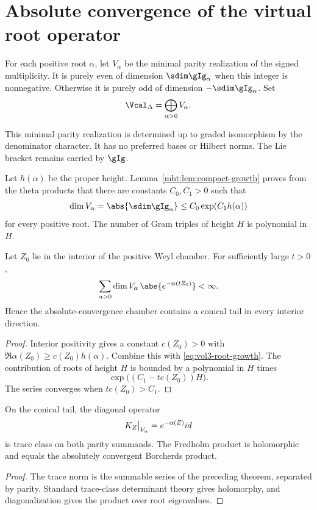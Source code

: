 \chapter{Absolute convergence of the virtual root operator}
For each positive root $\alpha$, let $V_\alpha$ be the minimal parity realization of the signed multiplicity. It is purely even of dimension $\sdim\gIg_\alpha$ when this integer is nonnegative. Otherwise it is purely odd of dimension $-\sdim\gIg_\alpha$. Set
\[
 \Vcal_\Delta=\widehat\bigoplus_{\alpha>0}V_\alpha.
\]

This minimal parity realization is determined up to graded isomorphism by the denominator character. It has no preferred bases or Hilbert norms. The Lie bracket remains carried by $\gIg$.

Let $h(\alpha)$ be the proper height.  Lemma~\ref{mht:lem:compact-growth} proves from the theta products that there are constants $C_0,C_1>0$ such that
\begin{equation}\label{eq:vol3-root-growth}
 \dim V_\alpha=\abs{\sdim\gIg_\alpha}\le C_0\exp(C_1h(\alpha))
\end{equation}
for every positive root.  The number of Gram triples of height $H$ is polynomial in $H$.

\begin{theorem}
Let $Z_0$ lie in the interior of the positive Weyl chamber.  For sufficiently large $t>0$,
\[
 \sum_{\alpha>0}\dim V_\alpha\,
 \abs{e^{-\alpha(tZ_0)}}<\infty.
\]
Hence the absolute-convergence chamber contains a conical tail in every interior direction.
\end{theorem}
\begin{proof}
Interior positivity gives a constant $c(Z_0)>0$ with
$\Re\alpha(Z_0)\ge c(Z_0)h(\alpha)$.
Combine this with \eqref{eq:vol3-root-growth}.  The contribution of roots of height $H$ is bounded by a polynomial in $H$ times
\[
 \exp\bigl((C_1-tc(Z_0))H\bigr).
\]
The series converges when $tc(Z_0)>C_1$.
\end{proof}

\begin{corollary}
On the conical tail, the diagonal operator
\[
 K_Z\big|_{V_\alpha}=e^{-\alpha(Z)}id
\]
is trace class on both parity summands.  The Fredholm product is holomorphic and equals the absolutely convergent Borcherds product.
\end{corollary}
\begin{proof}
The trace norm is the summable series of the preceding theorem, separated by parity.  Standard trace-class determinant theory gives holomorphy, and diagonalization gives the product over root eigenvalues.
\end{proof}


